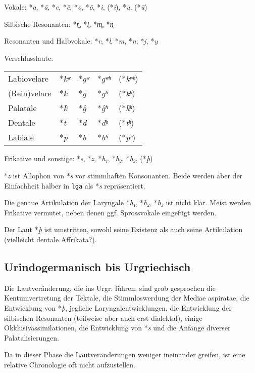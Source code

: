 \documentclass[12pt,a4paper,normalheadings]{scrartcl}
\def\rek#1{*\textit{#1}}
\def\tt#1{\texttt{#1}}
\begin{document}
\bigskip
\noindent
Vokale: \rek{a}, \rek{ā}, \rek{e}, \rek{ē}, \rek{o}, \rek{ō},
\rek{i}, (\rek{ī}), \rek{u}, (\rek{ū})

\noindent
Silbische Resonanten: \rek{r̥}, \rek{l̥}, \rek{m̥}, \rek{n̥}

\noindent
Resonanten und Halbvokale: \rek{r}, \rek{l}, \rek{m}, \rek{n}; \rek{i̯}, \rek{u̯}

\noindent
Verschlusslaute:\\
\begin{tabular}{l l l l l}
Labiovelare & \rek{kʷ} & \rek{gʷ} & \rek{gʷʰ} & (\rek{kʷʰ})\\
(Rein)velare & \rek{k} & \rek{g} & \rek{gʰ} & (\rek{kʰ})\\
Palatale & \rek{k̑} & \rek{g̑} & \rek{g̑ʰ} & (\rek{k̑ʰ})\\
Dentale & \rek{t} & \rek{d} & \rek{dʰ} & (\rek{tʰ})\\
Labiale & \rek{p} & \rek{b} & \rek{bʰ} & (\rek{pʰ})\\
\end{tabular}

\noindent
Frikative und sonstige: \rek{s}, \rek{z}, \rek{h₁}, \rek{h₂}, \rek{h₃}, (\rek{þ})

\bigskip
\rek{z} ist Allophon von \rek{s} vor stimmhaften Konsonanten.
Beide werden aber der Einfachheit halber in \tt{lga} als \rek{s} repräsentiert.

Die genaue Artikulation der Laryngale \rek{h₁}, \rek{h₂}, \rek{h₃}
ist nicht klar. Meist werden Frikative vermutet,
neben denen ggf. Sprossvokale eingefügt werden.

Der Laut \rek{þ} ist umstritten,
sowohl seine Existenz als auch seine Artikulation
(vielleicht dentale Affrikata?).

\subsection{Urindogermanisch bis Urgriechisch}

Die Lautveränderung,
die ins Urgr. führen, sind grob gesprochen
die Kentumvertretung der Tektale,
die Stimmloswerdung der Mediae aspiratae,
die Entwicklung von \rek{þ},
jegliche Laryngalentwicklungen,
die Entwicklung der silbischen Resonanten (teilweise aber auch erst dialektal),
einige Okklusivassimilationen,
die Entwicklung von \rek{s}
und die Anfänge diverser Palatalisierungen.

Da in dieser Phase die Lautveränderungen weniger ineinander greifen,
ist eine relative Chronologie oft nicht aufzustellen.
\end{document}
